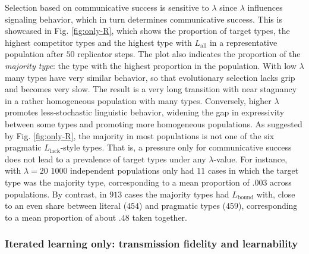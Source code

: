\documentclass[a4paper, 11pt]{article}
\theoremstyle{Satz}
\newcommand{\mylang}[1]{\ensuremath{L_{\text{#1}}}\xspace} %
\newcommand{\Lall}{\mylang{all}}
\newcommand{\Lbound}{\mylang{bound}}
\newcommand{\Llack}{\mylang{lack}}
\begin{document}
Selection based on communicative success is sensitive to $\lambda$ since $\lambda$
influences signaling behavior, which in turn determines communicative success. This is
showcased in Fig. \ref{fig:only-R}, which shows the proportion of target types, the highest competitor types and the highest type with $\Lall$ in a representative population after $50$ replicator steps. The plot also indicates the proportion of the
\emph{majority type}: the type with the highest proportion in the population. With
low $\lambda$ many types have very similar behavior, so that evolutionary selection lacks grip
and becomes very slow. The result is a very long transition with near stagnancy in a rather
homogeneous population with many types. Conversely, higher $\lambda$ promotes 
less-stochastic linguistic behavior, widening the gap in expressivity between some types and
promoting more homogeneous populations. As suggested by Fig. \ref{fig:only-R}, the majority
in most populations is not one of the six pragmatic $\Llack$-style types. That is, a pressure
only for communicative success does not lead to a prevalence of target types under any
$\lambda$-value. For instance, with $\lambda = 20$ $1000$ independent populations only had $11$
cases in which the target type was the majority type, corresponding to a mean proportion of
$.003$ across populations. By contrast, in $913$ cases the majority types had $\Lbound$ with,
close to an even share between literal ($454$) and pragmatic types ($459$), corresponding to a
mean proportion of about $.48$ taken together.


\subsubsection{Iterated learning only: transmission fidelity and learnability}
\end{document}
